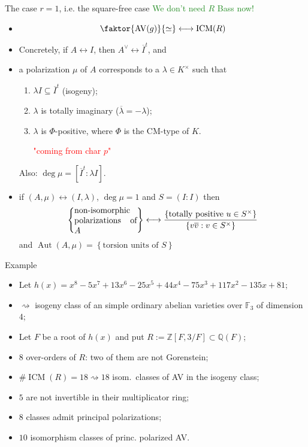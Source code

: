\documentclass[usenames,dvipsnames]{beamer}
\def\Q{\mathbb{Q}}
\def\Z{\mathbb{Z}}
\def\F{\mathbb{F}}
\DeclareMathOperator{\AV}{AV}
\DeclareMathOperator{\ICM}{ICM}
\DeclareMathOperator{\Aut}{Aut}
\newcommand{\set}[1]{\left\lbrace#1\right\rbrace }
\newcommand{\green}[1]{\textcolor{ForestGreen}{#1}}
\begin{document}
\begin{frame}{ The case $r=1$, i.e. the square-free case }
\pause \green{We don't need $R$ Bass now! }
\pause 
\begin{itemize}
 \item \[ \faktor{\AV(g)}{\simeq} \longleftrightarrow \ICM(R) \]
\pause \item Concretely, if $A\leftrightarrow I$, then $A^\vee \leftrightarrow \overline{I}^t$, and
\pause \item a polarization $\mu$ of $A$ corresponds to a $\lambda\in K^\times$ such that
      \begin{enumerate}[-]
\pause \item $\lambda I \subseteq \overline{I}^t$ (isogeny);
\pause \item $\lambda$ is totally imaginary ($\overline \lambda = -\lambda$);
\pause \item $\lambda$ is $\Phi$-positive, where $\Phi$ is the CM-type of $K$. \textcolor{red}{\parbox{6em}{\center "coming from char $p$"}}
      \end{enumerate} 
\pause Also: $\deg \mu= [\overline{I}^t : \lambda I]$.
\pause  \item if $(A,\mu) \leftrightarrow (I,\lambda)$,  $\deg \mu=1$ and $S=(I:I)$ then
  \[\set{\parbox[p]{7.5em}{non-isomorphic polarizations of $A$}} \longleftrightarrow \dfrac{\set{\text{totally positive }u\in S^\times }}{\set{v\overline{v}: v\in S^\times}}\]
  and $\Aut(A,\mu) = \set{\text{torsion units of $S$}}$
\end{itemize}
\end{frame}

\begin{frame}{ Example}
\begin{itemize}
 \item Let $h(x)=x^8 - 5x^7 + 13x^6 - 25x^5 + 44x^4 - 75x^3 + 117x^2 - 135x + 81$;
 \item $\rightsquigarrow$ isogeny class of an simple ordinary abelian varieties over $\F_{3}$ of dimension $4$;
 \item Let $F$ be a root of $h(x)$ and put $R:=\Z[F,3/F]\subset \Q(F)$;
 \item $8$ over-orders of $R$: two of them are not Gorenstein;
 \item $\#\ICM(R) = 18 \rightsquigarrow 18$ isom.~classes of AV in the isogeny class;
 \item $5$ are not invertible in their multiplicator ring;
 \item $8$ classes admit principal polarizations;
 \item $10$ isomorphism classes of princ. polarized AV.
\end{itemize}
\end{frame}
\end{document}
